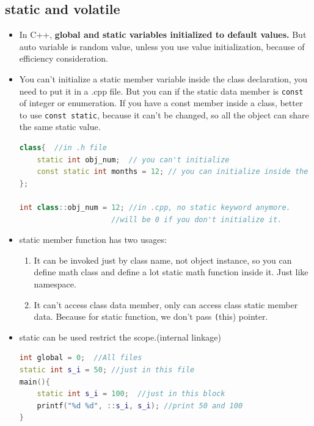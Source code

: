 \documentclass[a4paper,11pt,twoside]{book}
\begin{document}
\subsection{static and volatile}
\begin{itemize}
	\item In C++, \textbf{global and static variables initialized to default values.}  But auto variable is random value, unless you use value initialization, because of efficiency consideration. 
	
	\item You can't initialize a static member variable inside the class declaration, you need to put it in a .cpp file.   But you can if the static data member is \texttt{const} of integer or enumeration. If you have a const member inside a class, better to use \texttt{const static}, because it can't be changed, so all the object can share the same static value.
\begin{lstlisting}[frame=single, language=c++]
class{  //in .h file
	static int obj_num;  // you can't initialize
	const static int months = 12; // you can initialize inside the class
};

int class::obj_num = 12; //in .cpp, no static keyword anymore.	
                     //will be 0 if you don't initialize it.
\end{lstlisting}	
	
	\item static member function has two usages:
	\begin{enumerate}
		\item It can be invoked just by class name, not object instance, so you can define math class and define a lot static math function inside it.  Just like namespace.
		
		\item It can't access class data member, only can access class static member data. Because for static function, we don't pass \texttt(this) pointer.
	\end{enumerate}
	
	\item static can be used restrict the scope.(internal linkage)
\begin{lstlisting}[frame=single, language=c++]
int global = 0;  //All files
static int s_i = 50; //just in this file
main(){
	static int s_i = 100;  //just in this block
	printf("%d %d", ::s_i, s_i); //print 50 and 100
}
\end{lstlisting}
	\begin{description}
		

\end{description}
\end{itemize}
\end{document}
